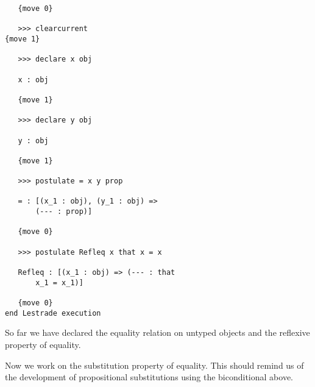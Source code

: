 \documentclass[12pt]{article}
\begin{document}
\begin{verbatim}
   {move 0}

   >>> clearcurrent
{move 1}

   >>> declare x obj

   x : obj

   {move 1}

   >>> declare y obj

   y : obj

   {move 1}

   >>> postulate = x y prop

   = : [(x_1 : obj), (y_1 : obj) => 
       (--- : prop)]

   {move 0}

   >>> postulate Refleq x that x = x

   Refleq : [(x_1 : obj) => (--- : that 
       x_1 = x_1)]

   {move 0}
end Lestrade execution

\end{verbatim}

So far we have declared the equality relation on untyped objects and the reflexive property of equality.

Now we work on the substitution property of equality.  This should remind us of the development of propositional substitutions using the biconditional above.
\end{document}
